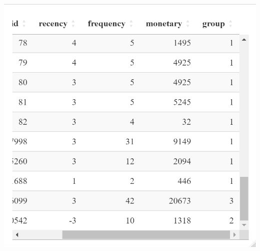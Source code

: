 \documentclass[
  11pt,
]{article}
\begin{document}
\includegraphics{img/table1.png}
\end{document}
